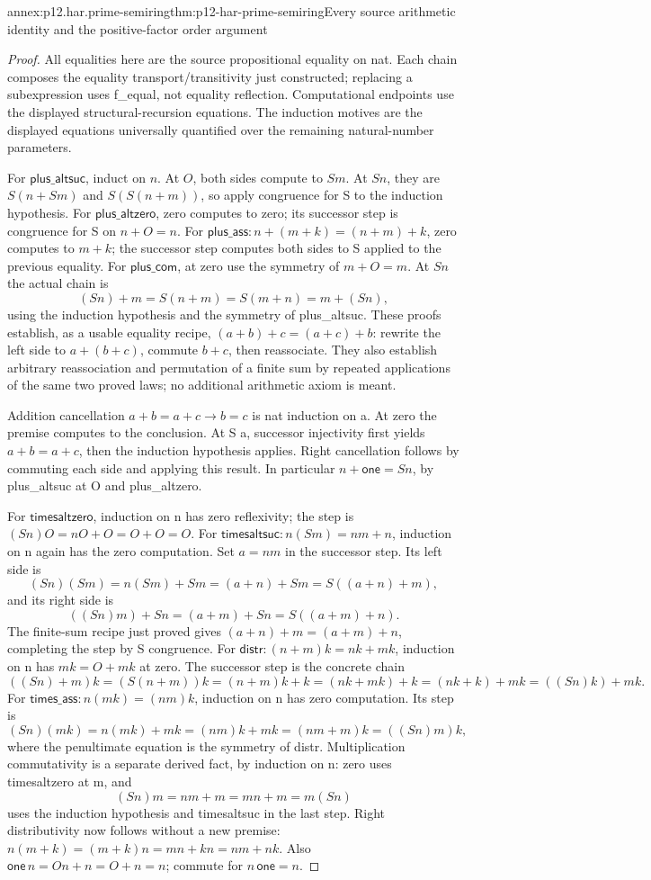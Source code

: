\begin{annexitem}{annex:p12.har.prime-semiring}{thm:p12-har-prime-semiring}{Every source arithmetic identity and the positive-factor order argument}
\begin{proof}
All equalities here are the source propositional equality on nat. Each
chain composes the equality transport/transitivity just constructed;
replacing a subexpression uses f_equal, not equality reflection.
Computational endpoints use the displayed structural-recursion equations.
The induction motives are the displayed equations universally quantified
over the remaining natural-number parameters.

For \(\mathsf{plus\_altsuc}\), induct on \(n\).
At \(O\), both sides compute to \(S m\). At \(S n\), they are
\(S(n+S m)\) and \(S(S(n+m))\), so apply congruence for S to the
induction hypothesis. For \(\mathsf{plus\_altzero}\), zero computes
to zero; its successor step is congruence for S on \(n+O=n\).
For \(\mathsf{plus\_ass}:n+(m+k)=(n+m)+k\), zero computes to
\(m+k\); the successor step computes both sides to S applied to
the previous equality. For \(\mathsf{plus\_com}\), at zero use
the symmetry of \(m+O=m\). At \(S n\) the actual chain is
\[
 (S n)+m=S(n+m)=S(m+n)=m+(S n),
\]
using the induction hypothesis and the symmetry of plus_altsuc.
These proofs establish, as a usable equality recipe,
\((a+b)+c=(a+c)+b\): rewrite the left side to \(a+(b+c)\),
commute \(b+c\), then reassociate. They also establish arbitrary
reassociation and permutation of a finite sum by repeated applications
of the same two proved laws; no additional arithmetic axiom is meant.

Addition cancellation \(a+b=a+c\to b=c\) is nat induction on a.
At zero the premise computes to the conclusion. At S a, successor
injectivity first yields \(a+b=a+c\), then the induction hypothesis
applies. Right cancellation follows by commuting each side and applying
this result. In particular \(n+\mathsf{one}=S n\), by plus_altsuc
at O and plus_altzero.

For \(\mathsf{timesaltzero}\), induction on n has zero reflexivity;
the step is \((S n)O=nO+O=O+O=O\).
For \(\mathsf{timesaltsuc}:n(S m)=nm+n\), induction on n again
has the zero computation. Set \(a=nm\) in the successor step.
Its left side is
\[
 (S n)(S m)=n(S m)+S m=(a+n)+S m=S((a+n)+m),
\]
and its right side is
\[
 ((S n)m)+S n=(a+m)+S n=S((a+m)+n).
\]
The finite-sum recipe just proved gives
\((a+n)+m=(a+m)+n\), completing the step by S congruence.
For \(\mathsf{distr}:(n+m)k=nk+mk\), induction on n has
\(mk=O+mk\) at zero. The successor step is the concrete chain
\[
 ((S n)+m)k=(S(n+m))k=(n+m)k+k
       =(nk+mk)+k=(nk+k)+mk=((S n)k)+mk.
\]
For \(\mathsf{times\_ass}:n(mk)=(nm)k\), induction on n has
zero computation. Its step is
\[
 (S n)(mk)=n(mk)+mk=(nm)k+mk=(nm+m)k=((S n)m)k,
\]
where the penultimate equation is the symmetry of distr.
Multiplication commutativity is a separate derived fact, by induction
on n: zero uses timesaltzero at m, and
\[
 (S n)m=nm+m=mn+m=m(S n)
\]
uses the induction hypothesis and timesaltsuc in the last step.
Right distributivity now follows without a new premise:
\(n(m+k)=(m+k)n=mn+kn=nm+nk\).
Also \(\mathsf{one}\,n=On+n=O+n=n\); commute for
\(n\,\mathsf{one}=n\).


\end{proof}
\end{annexitem}
